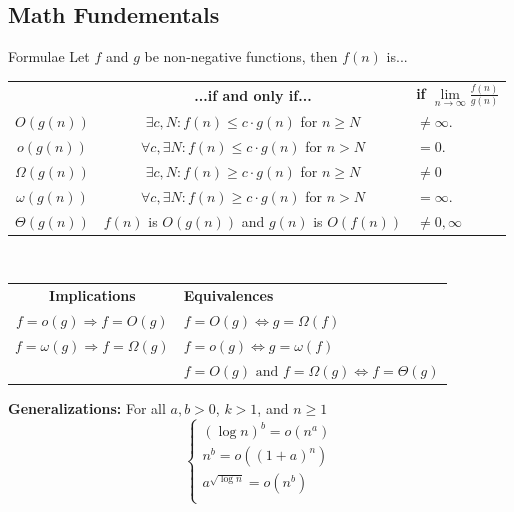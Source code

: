 \documentclass[10pt,a4paper]{article}
\begin{document}
\small
\begin{multicols}{3}

\scriptsize

\section{Math Fundementals}
\begin{textbox}{Formulae}
 Let $f$ and $g$ be non-negative functions, then $f(n)$ is...\\

\begin{tabular}{c|c|p{}}
     & {\bf...if and only if...} & {\bf if $\lim\limits_{n \to \infty} \frac{f(n)}{g(n)}$}  \\
    $O(g(n))$ & $\exists c,N:f(n)\leq c\cdot g(n)$ for $n\geq N$ & $\neq \infty$.  \\
    $o(g(n))$ & $\forall c,\exists N:f(n)\leq c\cdot g(n)$ for $n>N$ & $= 0$. \\
    $\Omega(g(n))$ & $\exists c,N:f(n)\geq c\cdot g(n)$ for $n\geq N$ & $\neq 0$\\
    $\omega(g(n))$ & $\forall c,\exists N:f(n)\geq c\cdot g(n)$ for $n>N$ & $= \infty$. \\
    $\Theta(g(n))$ & $f(n)$ is $O(g(n))$ and $g(n)$ is $O(f(n))$ & $\neq 0, \infty$ \\
\end{tabular}\\
\linebreak
\begin{tabular}{c|p{}}
    {\bf Implications} &  {\bf Equivalences} \\
    $f = o(g) \Rightarrow f = O(g)$ & $f = O(g) \Leftrightarrow g = \Omega(f)$ \\
    $f = \omega(g) \Rightarrow f = \Omega(g)$ & $f = o(g) \Leftrightarrow g = \omega(f)$ \\
     & $f = O(g) \text{ and } f = \Omega(g) \Leftrightarrow f = \Theta(g)$ \\
\end{tabular}
\linebreak
{\bf Generalizations:} For all $a, b > 0$, $k > 1$, and $n \geq 1$ 
\[\begin{cases}
    (\log n)^b = o(n^a)\\
    n^b = o((1 + a)^n) \\
    a^{\sqrt{\log n}} = o(n^b) \\

\end{cases}\]
\end{textbox}
\end{multicols}
\end{document}

